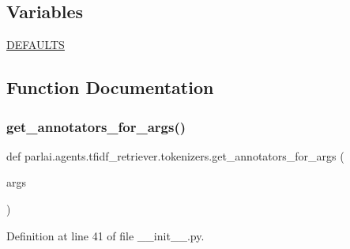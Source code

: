 \subsection*{Variables}
\begin{DoxyCompactItemize}
\item 
\hyperlink{namespaceparlai_1_1agents_1_1tfidf__retriever_1_1tokenizers_a481731228b5517a550cc272cad69474e}{D\+E\+F\+A\+U\+L\+TS}
\end{DoxyCompactItemize}


\subsection{Function Documentation}
\mbox{\label{namespaceparlai_1_1agents_1_1tfidf__retriever_1_1tokenizers_abbf344e2c42997de73bbe499f86cdba7}} 
\subsubsection{\texorpdfstring{get\+\_\+annotators\+\_\+for\+\_\+args()}{get\_annotators\_for\_args()}}
{\footnotesize\ttfamily def parlai.\+agents.\+tfidf\+\_\+retriever.\+tokenizers.\+get\+\_\+annotators\+\_\+for\+\_\+args (\begin{DoxyParamCaption}\item[{}]{args }\end{DoxyParamCaption})}



Definition at line 41 of file \+\_\+\+\_\+init\+\_\+\+\_\+.\+py.


